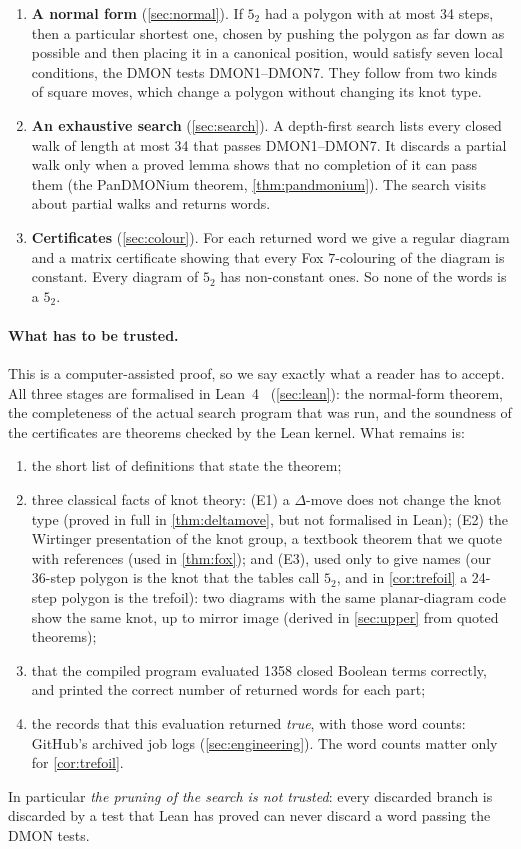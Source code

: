 \documentclass[11pt]{article}
\theoremstyle{plain}
\theoremstyle{definition}
\theoremstyle{remark}
\newcommand{\dmon}[1]{\textup{DMON#1}}
\begin{document}
\begin{enumerate}[leftmargin=*]
\item \textbf{A normal form} (\cref{sec:normal}). If $5_2$ had a polygon with at most 34 steps, then
a particular shortest one, chosen by pushing the polygon as far down as possible and then placing
it in a canonical position, would satisfy seven local conditions, the DMON tests
\dmon1--\dmon7. They follow from two kinds of square moves, which change a polygon without changing
its knot type.
\item \textbf{An exhaustive search} (\cref{sec:search}). A depth-first search lists every closed walk
of length at most 34 that passes \dmon1--\dmon7. It discards a partial walk only when a proved lemma
shows that no completion of it can pass them (the PanDMONium theorem, \cref{thm:pandmonium}). The
search visits about \NNodes{} partial walks and returns \NWords{} words.
\item \textbf{Certificates} (\cref{sec:colour}). For each returned word we give a regular diagram and
a matrix certificate showing that every Fox $7$-colouring of the diagram is constant. Every diagram of
$5_2$ has non-constant ones. So none of the words is a $5_2$.
\end{enumerate}

\paragraph{What has to be trusted.} This is a computer-assisted proof, so we say exactly what a
reader has to accept. All three stages are formalised in Lean~4~\cite{Lean4}
(\cref{sec:lean}): the normal-form theorem, the completeness of the actual search program that was
run, and the soundness of the certificates are theorems checked by the Lean kernel. What remains is:
\begin{enumerate}[label=(\roman*)]
\item the short list of definitions that state the theorem;
\item three classical facts of knot theory: (E1) a $\Delta$-move does not change the knot type
(proved in full in \cref{thm:deltamove}, but not formalised in Lean); (E2) the Wirtinger presentation of the knot group, a textbook
theorem that we quote with references (used in \cref{thm:fox}); and (E3), used only to give names
(our 36-step polygon is the knot that the tables call $5_2$, and in \cref{cor:trefoil} a 24-step polygon
is the trefoil): two diagrams with the same planar-diagram code show the same knot, up to mirror image
(derived in \cref{sec:upper} from quoted theorems);
\item that the compiled program evaluated \num{1358} closed Boolean terms correctly, and printed the
correct number of returned words for each part;
\item the records that this evaluation returned \emph{true}, with those word counts: GitHub's archived job
logs (\cref{sec:engineering}). The word counts matter only for \cref{cor:trefoil}.
\end{enumerate}
In particular \emph{the pruning of the search is not trusted}: every discarded branch is discarded
by a test that Lean has proved can never discard a word passing the DMON tests.
\end{document}
